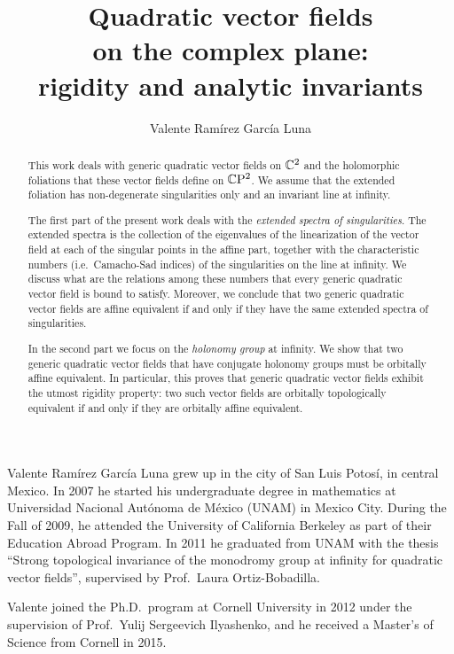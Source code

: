 \documentclass[phd,tocprelim]{cornell}
\title {Quadratic vector fields\\on the complex plane:\\rigidity and analytic invariants}
\author {Valente Ram\'{i}rez Garc\'{i}a Luna}
\begin{document}
\maketitle
\makecopyright

\cleardoublepage{} %
\begin{abstract}
 This work deals with generic quadratic vector fields on $\mathbb{C}^2$ and the holomorphic foliations that these vector fields define on $\mathbb{C}\mathrm{P}^2$. We assume that the extended foliation has non-degenerate singularities only and an invariant line at infinity.
 
 The first part of the present work deals with the \textit{extended spectra of singularities}. The extended spectra is the collection of the eigenvalues of the linearization of the vector field at each of the singular points in the affine part, together with the characteristic numbers (i.e.~Camacho-Sad indices) of the singularities on the line at infinity. We discuss what are the relations among these numbers that every generic quadratic vector field is bound to satisfy. Moreover, we conclude that two generic quadratic vector fields are affine equivalent if and only if they have the same extended spectra of singularities.
 
 In the second part we focus on the \textit{holonomy group} at infinity. We show that two generic quadratic vector fields that have conjugate holonomy groups must be orbitally affine equivalent. In particular, this proves that generic quadratic vector fields exhibit the utmost rigidity property: two such vector fields are orbitally topologically equivalent if and only if they are orbitally affine equivalent.

\begin{metadata} %
 
\end{metadata}
\end{abstract}


\cleardoublepage{}
\begin{biosketch}
Valente Ramírez García Luna grew up in the city of San Luis Potosí, in central Mexico. In 2007 he started his undergraduate degree in mathematics at Universidad Nacional Autónoma de México (UNAM) in Mexico City. During the Fall of 2009, he attended the University of California Berkeley as part of their Education Abroad Program. In 2011 he graduated from UNAM with the thesis ``Strong topological invariance of the monodromy group at infinity for quadratic vector fields'', supervised by Prof.~Laura Ortiz-Bobadilla.

Valente joined the Ph.D.~program at Cornell University in 2012 under the supervision of Prof.~Yulij Sergeevich Ilyashenko, and he received a Master's of Science from Cornell in 2015.
\end{biosketch}
\end{document}
